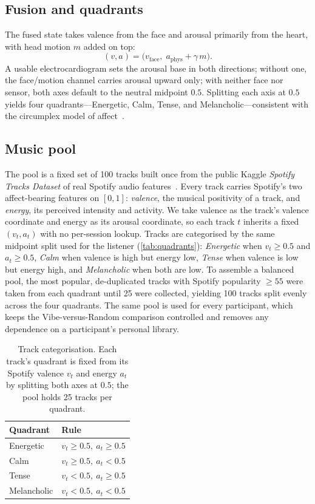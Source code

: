 \subsection{Fusion and quadrants}
The fused state takes valence from the face and arousal primarily from the heart,
with head motion $m$ added on top:
\begin{equation}
(v, a) = \bigl(v_{\mathrm{face}},\; a_{\mathrm{phys}} + \gamma\, m\bigr).
\end{equation}
A usable electrocardiogram sets the arousal base in both directions; without one,
the face/motion channel carries arousal upward only; with neither face nor sensor,
both axes default to the neutral midpoint $0.5$. Splitting each axis at $0.5$
yields four quadrants---Energetic, Calm, Tense, and Melancholic---consistent with
the circumplex model of affect~\cite{russell1980, posner2005}.

\subsection{Music pool}
The pool is a fixed set of 100 tracks built once from the public Kaggle
\emph{Spotify Tracks Dataset} of real Spotify audio features~\cite{spotifydataset}.
Every track carries Spotify's two affect-bearing features on $[0,1]$:
\emph{valence}, the musical positivity of a track, and \emph{energy}, its
perceived intensity and activity. We take valence as the track's valence
coordinate and energy as its arousal coordinate, so each track $t$ inherits a
fixed $(v_t, a_t)$ with no per-session lookup. Tracks are categorised by the same
midpoint split used for the listener (\autoref{tab:quadrants}): \emph{Energetic}
when $v_t \ge 0.5$ and $a_t \ge 0.5$, \emph{Calm} when valence is high but energy
low, \emph{Tense} when valence is low but energy high, and \emph{Melancholic} when
both are low. To assemble a balanced pool, the most popular, de-duplicated tracks
with Spotify popularity $\ge 55$ were taken from each quadrant until 25 were
collected, yielding 100 tracks split evenly across the four quadrants. The same
pool is used for every participant, which keeps the Vibe-versus-Random comparison
controlled and removes any dependence on a participant's personal library.

\begin{table}[t]
\caption{Track categorisation. Each track's quadrant is fixed from its Spotify
valence $v_t$ and energy $a_t$ by splitting both axes at $0.5$; the pool holds 25
tracks per quadrant.}
\label{tab:quadrants}
\begin{tabularx}{\linewidth}{@{}lX@{}}
\toprule
Quadrant & Rule \\
\midrule
Energetic   & $v_t \ge 0.5,\ a_t \ge 0.5$ \\
Calm        & $v_t \ge 0.5,\ a_t < 0.5$ \\
Tense       & $v_t < 0.5,\ a_t \ge 0.5$ \\
Melancholic & $v_t < 0.5,\ a_t < 0.5$ \\
\bottomrule
\end{tabularx}
\end{table}


